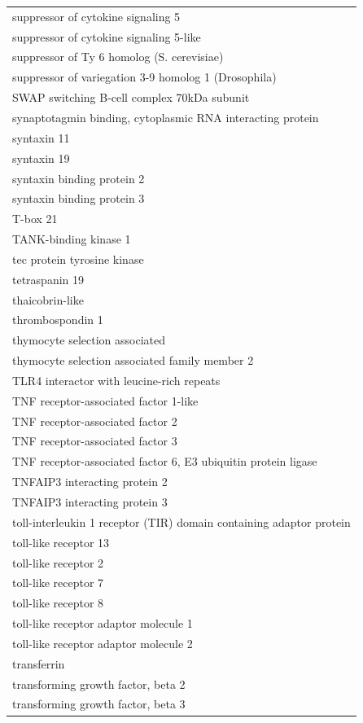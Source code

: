 \documentclass[english]{article}\usepackage[]{graphicx}\usepackage[]{color}
\begin{document}
\begin{longtable}{l}
suppressor of cytokine signaling 5 \\ 
suppressor of cytokine signaling 5-like \\ 
suppressor of Ty 6 homolog (S. cerevisiae) \\ 
suppressor of variegation 3-9 homolog 1 (Drosophila) \\ 
SWAP switching B-cell complex 70kDa subunit \\ 
synaptotagmin binding, cytoplasmic RNA interacting protein \\ 
syntaxin 11 \\ 
syntaxin 19 \\ 
syntaxin binding protein 2 \\ 
syntaxin binding protein 3 \\ 
T-box 21 \\ 
TANK-binding kinase 1 \\ 
tec protein tyrosine kinase \\ 
tetraspanin 19 \\ 
thaicobrin-like \\ 
thrombospondin 1 \\ 
thymocyte selection associated \\ 
thymocyte selection associated family member 2 \\ 
TLR4 interactor with leucine-rich repeats \\ 
TNF receptor-associated factor 1-like \\ 
TNF receptor-associated factor 2 \\ 
TNF receptor-associated factor 3 \\ 
TNF receptor-associated factor 6, E3 ubiquitin protein ligase \\ 
TNFAIP3 interacting protein 2 \\ 
TNFAIP3 interacting protein 3 \\ 
toll-interleukin 1 receptor (TIR) domain containing adaptor protein \\ 
toll-like receptor 13 \\ 
toll-like receptor 2 \\ 
toll-like receptor 7 \\ 
toll-like receptor 8 \\ 
toll-like receptor adaptor molecule 1 \\ 
toll-like receptor adaptor molecule 2 \\ 
transferrin \\ 
transforming growth factor, beta 2 \\ 
transforming growth factor, beta 3 \\ 

\end{longtable}
\end{document}
